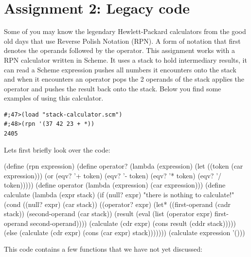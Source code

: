 \documentclass[12pt,a4paper,english,twoside]{article}
\begin{document}
\section{Assignment 2: Legacy code}
Some of you may know the legendary Hewlett-Packard calculators from the good 
old days that use Reverse Polish Notation (RPN). A form of notation that first 
denotes the operands followed by the operator. This assignment works with a 
RPN calculator
written in Scheme. It uses a stack to hold intermediary results, it can read a 
Scheme expression pushes all numbers it encounters onto the stack and when it 
encounters an operator pops the 2 operands of the stack applies the operator 
and pushes the result back onto the stack. Below you find some examples of 
using this calculator.
\begin{lstlisting}
#;47>(load "stack-calculator.scm")
#;48>(rpn '(37 42 23 + *))
2405
\end{lstlisting}
Lets first briefly look over the code:
\begin{schemecode}
(define (rpn expression)
  (define operator? 
    (lambda (expression)
      (let ((token (car expression)))
        (or (eqv? '+ token)
            (eqv? '- token)
            (eqv? '* token)
            (eqv? '/ token)))))
  (define operator 
    (lambda (expression) 
      (car expression)))
  (define calculate 
    (lambda (expr stack)
      (if (null? expr)
        "there is nothing to calculate!"
        (cond ((null? expr) (car stack))
              ((operator? expr)
               (let* ((first-operand (cadr stack))
                      (second-operand (car stack))
                      (result (eval (list 
                                      (operator expr) 
                                      first-operand 
                                      second-operand))))
                 (calculate (cdr expr) (cons result (cddr stack)))))
              (else (calculate (cdr expr) (cons (car expr) stack)))))))
  (calculate expression '()))
\end{schemecode}
This code contains a few functions that we have not yet discussed:
\end{document}
